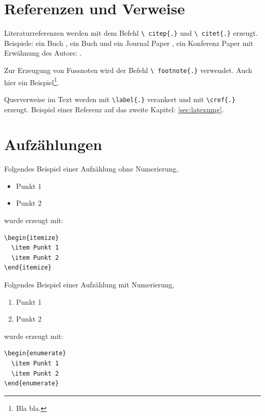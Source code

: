 \section{Referenzen und Verweise}
\label{sec:refverw}

Literaturreferenzen werden mit dem Befehl \texttt{\textbackslash
citep\{.\}} und \texttt{\textbackslash
citet\{.\}} erzeugt. Beispiele: ein Buch \citep{Raibert1986LeggedRobotsThatBalance}, ein Buch und ein Journal Paper \citep{Raibert1986LeggedRobotsThatBalance,Vukobratovic2004ZeroMomentPoint}, ein Konferenz Paper mit Erwähnung des Autors: \citet{Pratt1995SEA}.

Zur Erzeugung von Fussnoten wird der Befehl \texttt{\textbackslash
footnote\{.\}} verwendet. Auch hier ein Beispiel\footnote{Bla
bla.}.

Querverweise im Text werden mit \texttt{\textbackslash label\{.\}}
verankert und mit \texttt{\textbackslash cref\{.\}} erzeugt.
Beispiel einer Referenz auf das zweite Kapitel:
\cref{sec:latexumg}.


\section{Aufzählungen}\label{sec:aufz}

Folgendes Beispiel einer Aufzählung ohne Numerierung,
\begin{itemize}
  \item Punkt 1
  \item Punkt 2
\end{itemize}
wurde erzeugt mit:
\begin{verbatim}
\begin{itemize}
  \item Punkt 1
  \item Punkt 2
\end{itemize}
\end{verbatim}

Folgendes Beispiel einer Aufzählung mit Numerierung,
\begin{enumerate}
  \item Punkt 1
  \item Punkt 2
\end{enumerate}
wurde erzeugt mit:
\begin{verbatim}
\begin{enumerate}
  \item Punkt 1
  \item Punkt 2
\end{enumerate}
\end{verbatim}

